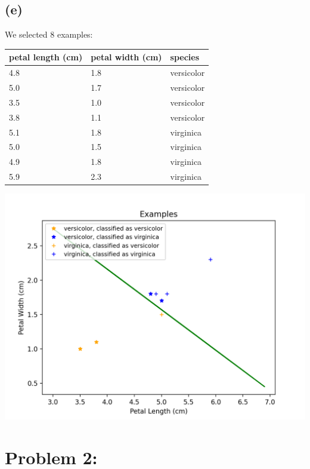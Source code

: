 \documentclass[12pt]{article}
\begin{document}
\subsection*{(e)}
We selected 8 examples:
\begin{center}
    \begin{tabular}{|l l l|}
        \hline
        petal length (cm) & petal width (cm) & species\\
        \hline
        4.8 & 1.8 & versicolor\\
        5.0 & 1.7 & versicolor\\
        3.5 & 1.0 & versicolor\\
        3.8 & 1.1 & versicolor\\
        5.1 & 1.8 & virginica \\
        5.0 & 1.5 & virginica \\
        4.9 & 1.8 & virginica \\
        5.9 & 2.3 & virginica \\
        \hline
    \end{tabular}
\end{center}

\begin{center}
    \includegraphics[scale=0.50]{fig/ai1e.png}
\end{center}

\section*{Problem 2: }
\end{document}

